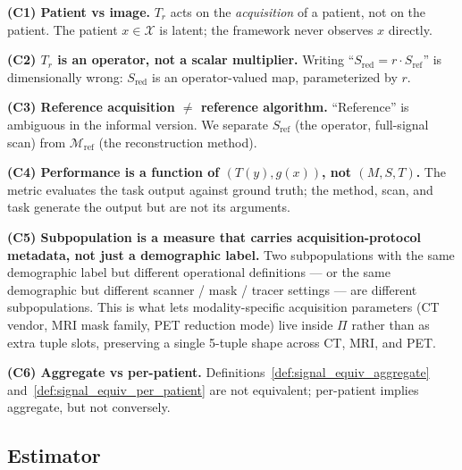 \documentclass[twoside,11pt]{article}
\newcommand{\Mref}{\mathcal{M}_{\textrm{ref}}}
\newcommand{\Sref}{S_{\textrm{ref}}}
\newcommand{\Sred}{S_{\textrm{red}}}
\begin{document}
\textbf{(C1) Patient vs image.} $T_r$ acts on the \emph{acquisition} of a patient, not on the patient. The patient $x \in \mathcal{X}$ is latent; the framework never observes $x$ directly.

\textbf{(C2) $T_r$ is an operator, not a scalar multiplier.} Writing ``$\Sred = r \cdot \Sref$'' is dimensionally wrong: $\Sred$ is an operator-valued map, parameterized by $r$.

\textbf{(C3) Reference acquisition $\neq$ reference algorithm.} ``Reference'' is ambiguous in the informal version. We separate $\Sref$ (the operator, full-signal scan) from $\Mref$ (the reconstruction method).

\textbf{(C4) Performance is a function of $(T(y), g(x))$, not $(M, S, T)$.} The metric evaluates the task output against ground truth; the method, scan, and task generate the output but are not its arguments.

\textbf{(C5) Subpopulation is a measure that carries acquisition-protocol metadata, not just a demographic label.} Two subpopulations with the same demographic label but different operational definitions --- or the same demographic but different scanner / mask / tracer settings --- are different subpopulations. This is what lets modality-specific acquisition parameters (CT vendor, MRI mask family, PET reduction mode) live inside $\Pi$ rather than as extra tuple slots, preserving a single 5-tuple shape across CT, MRI, and PET.

\textbf{(C6) Aggregate vs per-patient.} Definitions~\ref{def:signal_equiv_aggregate} and~\ref{def:signal_equiv_per_patient} are not equivalent; per-patient implies aggregate, but not conversely.

\subsection{Estimator}
\label{sec:methods-estimator}
\end{document}
